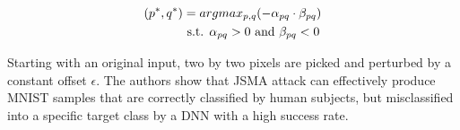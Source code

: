 \begin{align*}
(p^*, q^*) 
				&= arg max_{p, q} (- \alpha_{pq} \cdot \beta_{pq}) \\
                  & \textnormal{ s.t. } \alpha_{pq} > 0 \textnormal{ and } \beta_{pq} < 0
\end{align*}


Starting with an original input, two by two pixels are picked and perturbed by a constant offset $\epsilon$. The authors \cite{DBLP:journals/corr/PapernotMJFCS15} show that JSMA attack can effectively produce MNIST samples that are correctly classified by human subjects, but misclassified into a specific target class by a DNN with a high success rate. 